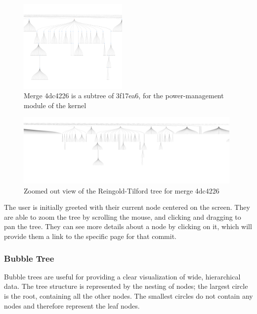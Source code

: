 \documentclass[draft]{IEEEtran}
\begin{document}
      \begin{figure}
        \centering
        \includegraphics[width=0.47\textwidth]{figures/4dc4_tree.pdf}
        \caption{Merge 4dc4226 is a subtree of 3f17ea6, for the power-management
          module of the kernel}
        \label{fig:reingold_tree}
      \end{figure}

      \begin{figure}
        \centering
        \includegraphics[width=0.98\textwidth]{figures/4dc4_zoom_tree.pdf}
        \caption{Zoomed out view of the Reingold-Tilford tree for merge 4dc4226}
        \label{fig:reingold_tree_zoom}
      \end{figure}

      The user is initially greeted with their current node centered on
      the screen.  They are able to zoom the tree by scrolling the
      mouse, and clicking and dragging to pan the tree. They can see
      more details about a node by clicking on it, which will provide
      them a link to the specific page for that commit.

\subsubsection{Bubble Tree}

Bubble trees are useful for providing a clear visualization of wide,
hierarchical data\cite{Boardman2000}. The tree structure is represented
by the nesting of nodes; the largest circle is the root, containing all
the other nodes. The smallest circles do not contain any nodes and
therefore represent the leaf nodes.
\end{document}
